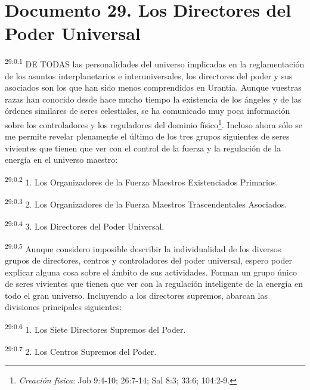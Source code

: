 \chapter{Documento 29. Los Directores del Poder Universal}
\par
\textsuperscript{29:0.1} DE TODAS las personalidades del universo implicadas en la reglamentación de los asuntos interplanetarios e interuniversales, los directores del poder y sus asociados son los que han sido menos comprendidos en Urantia. Aunque vuestras razas han conocido desde hace mucho tiempo la existencia de los ángeles y de las órdenes similares de seres celestiales, se ha comunicado muy poca información sobre los controladores y los reguladores del dominio físico\footnote{\textit{Creación física}: Job 9:4-10; 26:7-14; Sal 8:3; 33:6; 104:2-9.}. Incluso ahora sólo se me permite revelar plenamente el último de los tres grupos siguientes de seres vivientes que tienen que ver con el control de la fuerza y la regulación de la energía en el universo maestro:

\par
\textsuperscript{29:0.2} 1. Los Organizadores de la Fuerza Maestros Existenciados Primarios.

\par
\textsuperscript{29:0.3} 2. Los Organizadores de la Fuerza Maestros Trascendentales Asociados.

\par
\textsuperscript{29:0.4} 3. Los Directores del Poder Universal.

\par
\textsuperscript{29:0.5} Aunque considero imposible describir la individualidad de los diversos grupos de directores, centros y controladores del poder universal, espero poder explicar alguna cosa sobre el ámbito de sus actividades. Forman un grupo único de seres vivientes que tienen que ver con la regulación inteligente de la energía en todo el gran universo. Incluyendo a los directores supremos, abarcan las divisiones principales siguientes:

\par
\textsuperscript{29:0.6} 1. Los Siete Directores Supremos del Poder.

\par
\textsuperscript{29:0.7} 2. Los Centros Supremos del Poder.

